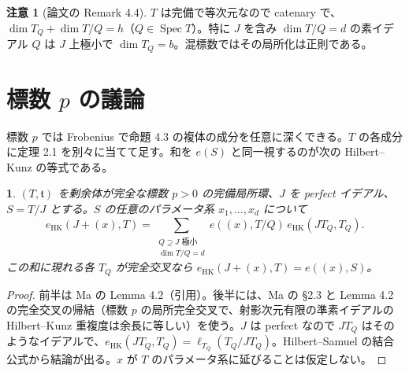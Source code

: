 \documentclass[11pt,a4paper]{ltjsarticle}
\newcommand{\stmtname}{}
\theoremstyle{plain}
\newtheorem*{stmtgen}{\stmtname}
\newenvironment{stmt}[1]{\renewcommand{\stmtname}{#1}\begin{stmtgen}}{\end{stmtgen}}
\theoremstyle{definition}
\newtheorem*{remark*}{注意}
\newcommand{\tf}{\mathfrak{t}}
\newcommand{\Spec}{\operatorname{Spec}}
\newcommand{\eHK}{e_{\mathrm{HK}}}
\begin{document}
\begin{remark*}[論文の Remark 4.4]
$T$ は完備で等次元なので catenary で、$\dim T_Q+\dim T/Q = h$（$Q\in\Spec T$）。特に $J$ を含み $\dim T/Q = d$ の素イデアル $Q$ は $J$ 上極小で $\dim T_Q = b$。混標数ではその局所化は正則である。
\end{remark*}
\section{標数 $p$ の議論}\label{sec:charp}

標数 $p$ では Frobenius で命題 4.3 の複体の成分を任意に深くできる。$T$ の各成分に定理 2.1 を別々に当てて足す。和を $e(S)$ と同一視するのが次の Hilbert--Kunz の等式である。

\begin{stmt}{補題 5.1（Ma の Hilbert--Kunz の等式）}
$(T,\tf)$ を剰余体が完全な標数 $p>0$ の完備局所環、$J$ を perfect イデアル、$S = T/J$ とする。$S$ の任意のパラメータ系 $x_1,\dots,x_d$ について
\[
  \eHK(J+(x),T) = \sum_{\substack{Q\supseteq J\text{ 極小}\\ \dim T/Q = d}}e((x),T/Q)\,\eHK(JT_Q,T_Q).
\]
この和に現れる各 $T_Q$ が完全交叉なら $\eHK(J+(x),T) = e((x),S)$。
\end{stmt}
\begin{proof}
前半は Ma の Lemma 4.2（引用）。後半には、Ma の \S2.3 と Lemma 4.2 の完全交叉の帰結（標数 $p$ の局所完全交叉で、射影次元有限の準素イデアルの Hilbert--Kunz 重複度は余長に等しい）を使う。$J$ は perfect なので $JT_Q$ はそのようなイデアルで、$\eHK(JT_Q,T_Q) = \ell_{T_Q}(T_Q/JT_Q)$。Hilbert--Samuel の結合公式から結論が出る。$x$ が $T$ のパラメータ系に延びることは仮定しない。
\end{proof}
\end{document}
